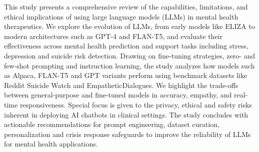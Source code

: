 This study presents a comprehensive review of the capabilities, limitations, and ethical implications of using large language models (LLMs) in mental health therapeutics. We explore the evolution of LLMs, from early models like ELIZA to modern architectures such as GPT-4 and FLAN-T5, and evaluate their effectiveness across mental health prediction and support tasks including stress, depression and suicide risk detection. Drawing on fine-tuning strategies, zero- and few-shot prompting and instruction learning, the study analyzes how models such as Alpaca, FLAN-T5 and GPT variants perform using benchmark datasets like Reddit Suicide Watch and EmpatheticDialogues. We highlight the trade-offs between general-purpose and fine-tuned models in accuracy, empathy, and real-time responsiveness. Special focus is given to the privacy, ethical and safety risks inherent in deploying AI chatbots in clinical settings. The study concludes with actionable recommendations for prompt engineering, dataset curation, personalization and crisis response safeguards to improve the reliability of LLMs for mental health applications.